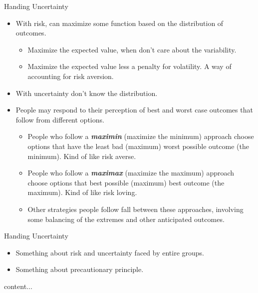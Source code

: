 \begin{frame}{Handing Uncertainty}
	\begin{itemize}
		\item With risk, can maximize some function based on the distribution of outcomes.
		\begin{itemize}
			\item Maximize the expected value, when don't care about the variability.
			\item Maximize the expected value less a penalty for volatility.  A way of accounting for risk aversion.
		\end{itemize}
		\item With uncertainty don't know the distribution.
		\item People may respond to their perception of best and worst case outcomes that follow from different options.
		\begin{itemize}
			\item People who follow a \textbf{\textit{maximin}} (maximize the minimum) approach choose options that have the least bad (maximum) worst possible outcome (the minimum). Kind of like risk averse.
			\item People who follow a \textbf{\textit{maximax}} (maximize the maximum) approach choose options that best possible (maximum) best outcome (the maximum).  Kind of like risk loving.
			\item Other strategies people follow fall between these approaches, involving some balancing of the extremes and other anticipated outcomes.
		\end{itemize}
	\end{itemize}
\end{frame}

\begin{frame}{Handing Uncertainty}
	\begin{itemize}
		\item Something about risk and uncertainty faced by entire groups.
		\item Something about precautionary principle.
	\end{itemize}
	content...
\end{frame}
